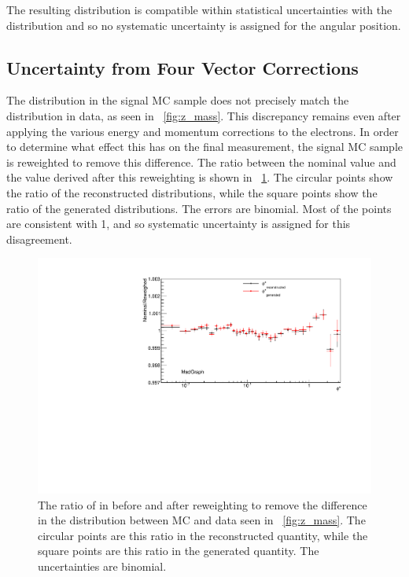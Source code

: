 The resulting \phistarSC distribution is compatible within statistical
uncertainties with the \phistar distribution and so no systematic uncertainty
is assigned for the angular position.


\subsection{Uncertainty from Four Vector Corrections}

The \mee distribution in the \MADGRAPH signal MC sample does not precisely
match the distribution in data, as seen in \FIG~\ref{fig:z_mass}. This
discrepancy remains even after applying the various energy and momentum
corrections to the electrons. In order to determine what effect this has on the
final measurement, the \MADGRAPH signal MC sample is reweighted to remove this
difference. The ratio between the nominal \phistar value and the value derived
after this reweighting is shown in \FIG~\ref{fig:z_mass_reweighted}. The
circular points show the ratio of the reconstructed \phistar distributions,
while the square points show the ratio of the generated \phistar distributions.
The errors are binomial. Most of the points are consistent with \num{1}, and so
systematic uncertainty is assigned for this disagreement.

\begin{figure}[!htbp]
    \centering
    \includegraphics[width=\textwidth]{figures/ZMass_reweighed.pdf}
    \caption[
        The ratio of \phistar in \MADGRAPH before and after reweighting to
        remove the differnce in the \mee distribution between MC and data.
    ]{
        The ratio of \phistar in \MADGRAPH before and after reweighting to
        remove the difference in the \mee distribution between MC and data seen
        in \FIG~\ref{fig:z_mass}. The circular points are this ratio in the
        reconstructed quantity, while the square points are this ratio in the
        generated quantity. The uncertainties are binomial.
    }
    \label{fig:z_mass_reweighted}
\end{figure}
